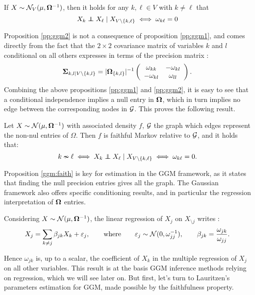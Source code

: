  \begin{prop}\label{pp:ggm2}If  $X\sim \mathcal{N}_V(\mu, {\boldsymbol{\Omega}}^{-1})$, then it holds for any $k,\ell\in V$ with $k\neq \ell$ that
$$X_k \independent X_\ell \mid X_{V\setminus\{k,\ell\}} \iff \omega_{k\ell}=0 $$
 \end{prop}
  Proposition \ref{pp:ggm2} is not a consequence of proposition \ref{pp:ggm1}, and comes directly from the fact that the $2\times 2$  covariance matrix of variables $k$ and $l$ conditional on all others expresses in terms of the precision matrix : $${\boldsymbol{\Sigma}}_{k,l\mid V\setminus\{k,l\}} = |{\boldsymbol{\Omega}}_{\{k,l\}}|^{-1} \left(\begin{array}{cc}
\omega_{kk} & -\omega_{kl}\\
-\omega_{kl} & \omega_{ll}  
  \end{array}\right).$$
Combining the above propositions \ref{pp:ggm1} and \ref{pp:ggm2}, it is easy to see that a conditional independence implies a null entry in ${\boldsymbol{\Omega}}$, which in turn implies no edge between the corresponding nodes in $\mathcal{G}$. This proves the following result.

\begin{prop}\label{ggm:faith}
 Let $X\sim \mathcal{N}(\mu, {\boldsymbol{\Omega}}^{-1})$ with associated density $f$, $\mathcal{G}$ the graph which edges represent the non-nul entries of $\Omega$. Then $f$ is faithful Markov relative to $\mathcal{G}$,  and it holds that:
 $$k\nsim \ell \iff  X_k \independent X_\ell \mid X_{V\setminus\{k,\ell\}} \iff \omega_{k\ell}=0.$$
\end{prop} 

Proposition \ref{ggm:faith} is key for estimation in the GGM framework, as it states that finding the null precision entries gives all the graph. The Gaussian framework also offers specific conditioning results, and in particular the regression interpretation of ${\boldsymbol{\Omega}}$ entries.

\begin{prop}
 Considering $X\sim \mathcal{N}(\mu, {\boldsymbol{\Omega}}^{-1})$, the linear regression of  $X_j$ on $X_{\setminus j}$ writes :
$$X_j = \sum_{k\neq j} \beta_{jk} X_k + \varepsilon_j,\qquad \text{where}\qquad\varepsilon_j \sim \mathcal{N} (0, \omega_{jj}^{-1}), \qquad \beta_{jk} = \frac{\omega_{jk}}{\omega_{jj}}.$$

\end{prop}
Hence $\omega_{jk}$ is, up to a scalar, the coefficient of $X_k$ in the multiple regression of $X_j$ on all other variables. This result is at the basis GGM inference methods relying on regression, which we will see later on. But first, let's turn to Lauritzen's  parameters estimation for GGM, made possible by the faithfulness property.


